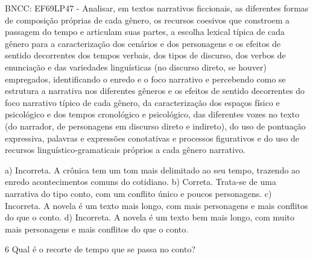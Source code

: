 \begin{itemize}
\begin{itemize}
\begin{escolha}
\begin{escolha}
\begin{escolha}
\begin{escolha}
\begin{escolha}
\begin{escolha}
\begin{escolha}
\begin{escolha}
\begin{escolha}
\begin{escolha}
\begin{escolha}
\begin{escolha}
\begin{escolha}
BNCC: EF69LP47 - Analisar, em textos narrativos ficcionais, as
diferentes formas de composição próprias de cada gênero, os recursos
coesivos que constroem a passagem do tempo e articulam suas partes, a
escolha lexical típica de cada gênero para a caracterização dos cenários
e dos personagens e os efeitos de sentido decorrentes dos tempos
verbais, dos tipos de discurso, dos verbos de enunciação e das
variedades linguísticas (no discurso direto, se houver) empregados,
identificando o enredo e o foco narrativo e percebendo como se estrutura
a narrativa nos diferentes gêneros e os efeitos de sentido decorrentes
do foco narrativo típico de cada gênero, da caracterização dos espaços
físico e psicológico e dos tempos cronológico e psicológico, das
diferentes vozes no texto (do narrador, de personagens em discurso
direto e indireto), do uso de pontuação expressiva, palavras e
expressões conotativas e processos figurativos e do uso de recursos
linguístico-gramaticais próprios a cada gênero narrativo.

a) Incorreta. A crônica tem um tom mais delimitado ao seu tempo,
trazendo ao enredo acontecimentos comuns do cotidiano. b) Correta.
Trata-se de uma narrativa do tipo conto, com um conflito único e poucos
personagens. c) Incorreta. A novela é um texto mais longo, com mais
personagens e mais conflitos do que o conto. d) Incorreta. A novela é um
texto bem mais longo, com muito mais personagens e mais conflitos do que
o conto.

\num{6} Qual é o recorte de tempo que se passa no conto?

\end{escolha}
\end{escolha}
\end{escolha}
\end{escolha}
\end{escolha}
\end{escolha}
\end{escolha}
\end{escolha}
\end{escolha}
\end{escolha}
\end{escolha}
\end{escolha}
\end{escolha}
\end{itemize}
\end{itemize}
